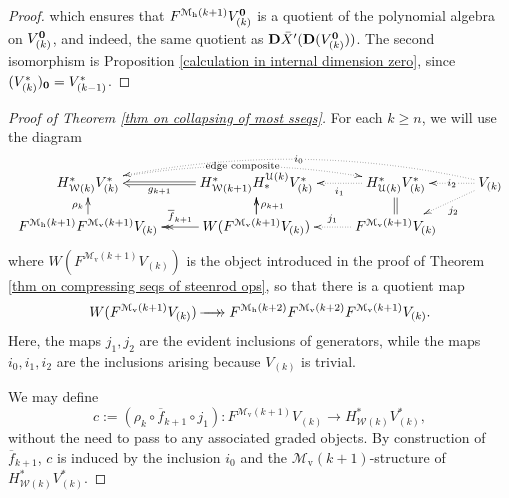 \documentclass[11pt]{amsart} \renewcommand{\baselinestretch}{1.2}
\theoremstyle{plain}
\numberwithin{equation}{section} %
\theoremstyle{plain}
\numberwithin{equation}{chapter} %
\renewcommand{\to}{\longrightarrow}
\newcommand{\calU}{\mathcal{U}}
\newcommand{\calw}{\mathcal{W}}
\newcommand{\calMv}{\mathcal{M}\dver}
\newcommand{\calMh}{\mathcal{M}\dhor}
\newcommand{\epi}{{\,\makebox[0cm][l]{\ensuremath\to}\to{}}}
\newcommand{\UEAX}{\bar{X}'}%
\newcommand{\dver}{_\mathrm{v}}
\newcommand{\dhor}{_\mathrm{h}}
\newcommand{\dual}{\mathbf{D}}
\begin{document}
\begin{Calculations of HWn}
\begin{proof}
which ensures that $F^{\calMh(k+1)}V_{(k)}^{\textbf{\textup{0}}}$ is a quotient of the polynomial algebra on $V_{(k)}^{\textbf{\textup{0}}}$, and indeed, the same quotient as $\dual\UEAX(\dual(V_{(k)}^{\textbf{\textup{0}}}))$. The second isomorphism is Proposition \ref{calculation in internal dimension zero}, since $(V^*_{(k)})_{\textbf{\textup{0}}}=V^*_{(k-1)}$.
\end{proof}
\begin{proof}[Proof of Theorem \ref{thm on collapsing of most sseqs}]
For each $k\geq n$, we will use the diagram
\[\xymatrix@R=4mm{
H^*_{\calw(k)}V^*_{(k)}\ar@{..>}@/^1.22em/[rr]|-{\textup{\,edge composite\,}}
&H^*_{\calw(k+1)}H_*^{\calU(k)}V^*_{(k)}\ar@{=>}[l]^-{g_{k+1}}%
&H^*_{\calU(k)}V^*_{(k)}\ar@{..>}[l]^-{i_1}
&V_{(k)}\ar@{..>}[l]|-{\,i_2\,}\ar@{..>}[ld]^-{j_2}\ar@{..>}@/_1.72em/[lll]|-{\,i_0\,}
\\
F^{\calMh(k+1)}F^{\calMv(k+1)}V_{(k)}\ar[u]^-{\rho_k}
&W(F^{\calMv(k+1)}V_{(k)})\ar[u]\ar@{->>}[l]_-{\overline{f}_{k+1}}\ar[u]_-{\rho_{k+1}}
&F^{\calMv(k+1)}V_{(k)}\ar@{..>}[l]_-{j_1}\ar@{=}[u]%
}\]
where $W(F^{\calMv(k+1)}V_{(k)})$ is the object introduced in the proof of Theorem \ref{thm on compressing seqs of steenrod ops}, so that there is a quotient map
\[W(F^{\calMv(k+1)}V_{(k)})\epi F^{\calMh(k+2)}F^{\calMv(k+2)}F^{\calMv(k+1)}V_{(k)}.\]
Here, the maps $j_1,j_2$ are the evident inclusions of generators, while the maps $i_0,i_1,i_2$ are the inclusions arising because $V_{(k)}$ is trivial.

 We may define 
\[c:=(\rho_k\circ \overline{f}_{k+1}\circ j_1):F^{\calMv(k+1)}V_{(k)}\to H^*_{\calw(k)}V^*_{(k)},\]
without the need to pass to any associated graded objects. By construction of $\overline{f}_{k+1}$,  $c$ is induced by the inclusion $i_0$ and the $\calMv(k+1)$-structure of $H^*_{\calw(k)}V^*_{(k)}$.


\end{proof}
\end{Calculations of HWn}
\end{document}
